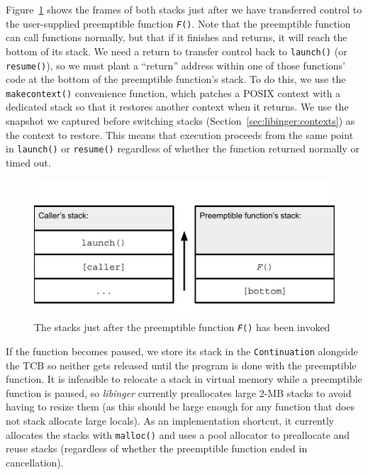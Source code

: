 Figure~\ref{fig:twostacks} shows the frames of both stacks just after we have
transferred control to the user-supplied preemptible function \texttt{\textit{F}()}.
Note that the preemptible function can call functions normally, but that if it
finishes and returns, it will reach the bottom of its stack.  We need a return to
transfer control back to \texttt{launch()} (or \texttt{resume()}), so we must plant a
``return'' address within one of those functions' code at the bottom of the
preemptible function's stack.  To do this, we use the \texttt{makecontext()}
convenience function, which patches a POSIX context with a dedicated stack so that it
restores another context when it returns.  We use the snapshot we captured before
switching stacks (Section~\ref{sec:libinger:contexts}) as the context to restore.
This means that execution proceeds from the same point in \texttt{launch()} or
\texttt{resume()} regardless of whether the function returned normally or timed out.

\begin{figure}
\includegraphics[width=\columnwidth]{figs/twostacks}
\caption{The stacks just after the preemptible function \texttt{\textit{F}()} has been invoked}
\label{fig:twostacks}
\end{figure}

If the function becomes paused, we store its stack in the \texttt{Continuation}
alongside the TCB so neither gets released until the program is done with the
preemptible function.  It is infeasible to relocate a stack in virtual memory while a
preemptible function is paused, so \textit{libinger} currently preallocates large
2-MB stacks to avoid having to resize them (as this should be large enough for any
function that does not stack allocate large locals).  As an implementation shortcut,
it currently allocates the stacks with \texttt{malloc()} and uses a pool
allocator to preallocate and reuse stacks (regardless of whether the preemptible
function ended in cancellation).

